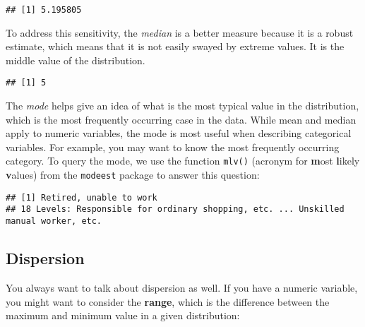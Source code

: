 \documentclass[
]{book}
\newenvironment{Shaded}{\begin{snugshade}}{\end{snugshade}}
\newcommand{\AttributeTok}[1]{\textcolor[rgb]{0.13,0.29,0.53}{#1}}
\newcommand{\ConstantTok}[1]{\textcolor[rgb]{0.56,0.35,0.01}{#1}}
\newcommand{\FunctionTok}[1]{\textcolor[rgb]{0.13,0.29,0.53}{\textbf{#1}}}
\newcommand{\NormalTok}[1]{#1}
\newcommand{\SpecialCharTok}[1]{\textcolor[rgb]{0.81,0.36,0.00}{\textbf{#1}}}
\begin{document}
\begin{verbatim}
## [1] 5.195805
\end{verbatim}

To address this sensitivity, the \emph{median} is a better measure because it is a robust estimate, which means that it is not easily swayed by extreme values. It is the middle value of the distribution.

\begin{Shaded}
\end{Shaded}

\begin{verbatim}
## [1] 5
\end{verbatim}

The \emph{mode} helps give an idea of what is the most typical value in the distribution, which is the most frequently occurring case in the data. While mean and median apply to numeric variables, the mode is most useful when describing categorical variables. For example, you may want to know the most frequently occurring category. To query the mode, we use the function \texttt{mlv()} (acronym for \textbf{m}ost \textbf{l}ikely \textbf{v}alues) from the \texttt{modeest} package to answer this question:

\begin{Shaded}
\end{Shaded}

\begin{verbatim}
## [1] Retired, unable to work
## 18 Levels: Responsible for ordinary shopping, etc. ... Unskilled manual worker, etc.
\end{verbatim}

\subsection{Dispersion}\label{dispersion}

You always want to talk about dispersion as well. If you have a numeric variable, you might want to consider the \textbf{range}, which is the difference between the maximum and minimum value in a given distribution:
\end{document}
